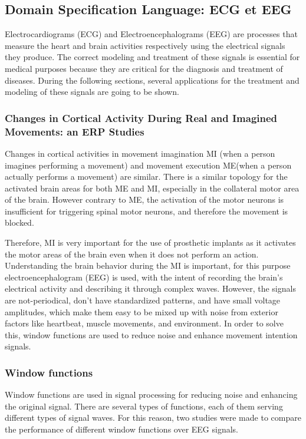 \subsection{Domain Specification Language: ECG et EEG}

Electrocardiograms (ECG) and Electroencephalograms (EEG) are processes that measure the heart and brain activities respectively using the electrical signals they produce. The correct modeling and treatment of these signals is essential for medical purposes because they are critical for the diagnosis and treatment of diseases. During the following sections, several applications for the treatment and modeling of these signals are going to be shown.

\subsubsection{Changes in Cortical Activity During Real and Imagined Movements: an ERP Studies}

Changes in cortical activities in movement imagination MI (when a person imagines performing a movement) and movement execution ME(when a person actually performs a movement) are similar. There is a similar topology for the activated brain areas for both ME and MI, especially in the collateral motor area of the brain. However contrary to ME, the activation of the motor neurons is insufficient for triggering spinal motor neurons, and therefore the movement is blocked.

Therefore, MI is very important for the use of prosthetic implants as it activates the motor areas of the brain even when it does not perform an action. Understanding the brain behavior during the MI is important, for this purpose electroencephalogram (EEG) is used, with the intent of recording the brain’s electrical activity and describing it through complex waves.  However, the signals are not-periodical, don't have standardized patterns, and have small voltage amplitudes, which make them easy to be mixed up with noise from exterior factors like heartbeat, muscle movements, and environment. In order to solve this, window functions are used to reduce noise and enhance movement intention signals.

\subsubsection{Window functions}

Window functions are used in signal processing for reducing noise and enhancing the original signal. There are several types of functions, each of them serving different types of signal waves.  For this reason, two studies were made to compare the performance of different window functions over EEG signals.\\

